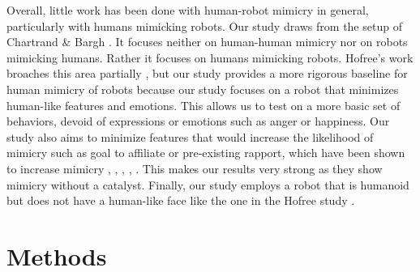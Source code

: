 \documentclass{acm_proc_article-sp}
\begin{document}
Overall, little work has been done with human-robot mimicry in general, particularly with humans mimicking robots. Our study draws from the setup of Chartrand \& Bargh \cite{chartrand1999chameleon}. It focuses neither on human-human mimicry nor on robots mimicking humans. Rather it focuses on humans mimicking robots. Hofree's work broaches this area partially \cite{hofree2014bridging}, but our study provides a more rigorous baseline for human mimicry of robots because our study focuses on a robot that minimizes human-like features and emotions. This allows us to test on a more basic set of behaviors, devoid of expressions or emotions such as anger or happiness. Our study also aims to minimize features that would increase the likelihood of mimicry such as goal to affiliate or pre-existing rapport, which have been shown to increase mimicry \cite{chartrand2013antecedents}, \cite{drury2006effects}, \cite{lakin2003using}, \cite{likowski2008modulation}, \cite{mcintosh2006social}. This makes our results very strong as they show mimicry without a catalyst. Finally, our study employs a robot that is humanoid but does not have a human-like face like the one in the Hofree study \cite{hofree2014bridging}.

\section{Methods} 
\end{document}

